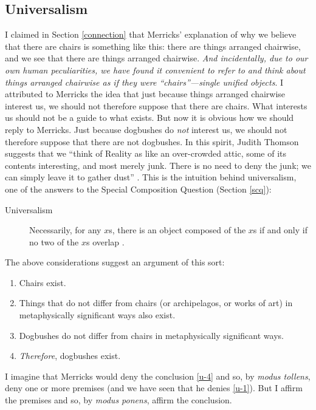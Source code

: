 \documentclass[11pt]{article}
\begin{document}
\begin{spacing}{1.25}
\section{Universalism}
\label{universalism}
I claimed in Section \ref{connection} that Merricks' explanation of
why we believe that there are chairs is something like this: there are
things arranged chairwise, and we see that there are things arranged
chairwise.  {\em And incidentally, due to our own human peculiarities,
  we have found it convenient to refer to and think about things
  arranged chairwise as if they were ``chairs''---single unified
  objects}.  I attributed to Merricks the idea that just because
things arranged chairwise interest us, we should not therefore suppose
that there are chairs.  What interests us should not be a guide to
what exists.  But now it is obvious how we should reply to Merricks.
Just because dogbushes do {\em not} interest us, we should not
therefore suppose that there are not dogbushes.  In this spirit,
Judith Thomson suggests that we ``think of Reality as like an
over-crowded attic, some of its contents interesting, and most merely
junk.  There is no need to deny the junk; we can simply leave it to
gather dust'' \citep[167]{thomson1998a}.  This is the intuition behind
universalism, one of the answers to the Special Composition Question
(Section \ref{scq}):

\begin{description}
\item[Universalism] Necessarily, for any $x$s, there is an object
  composed of the $x$s if and only if no two of the $x$s overlap
  \citep[227]{markosian1998a}.
\end{description}

The above considerations suggest an argument of this sort:

\begin{enumerate}[ref=(\arabic*)]
  \item Chairs exist. \label{u-1}
  \item Things that do not differ from chairs (or archipelagos, or
    works of art) in metaphysically significant ways also exist.
  \item Dogbushes do not differ from chairs in metaphysically
    significant ways.
  \item {\em Therefore}, dogbushes exist. \label{u-4}
\end{enumerate}

I imagine that Merricks would deny the conclusion \ref{u-4} and so, by
{\em modus tollens}, deny one or more premises (and we have seen that
he denies \ref{u-1}).  But I affirm the premises and so, by {\em modus
  ponens}, affirm the conclusion.


\end{spacing}
\end{document}
